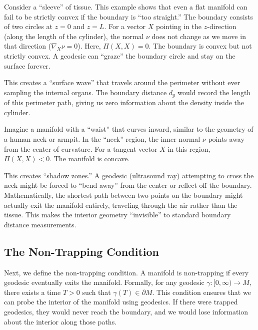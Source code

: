 \begin{example}
  Consider a ``sleeve'' of tissue. This example shows that even a flat manifold can fail to be strictly convex if the boundary is ``too straight.'' The boundary consists of two circles at $z = 0$ and $z = L$. For a vector $X$ pointing in the $z$-direction (along the length of the cylinder), the normal $\nu$ does not change as we move in that direction ($\nabla_X \nu = 0$). Here, $\Pi(X, X) = 0$. The boundary is convex but not strictly convex. A geodesic can ``graze'' the boundary circle and stay on the surface forever.

  This creates a ``surface wave'' that travels around the perimeter without ever sampling the internal organs. The boundary distance $d_g$ would record the length of this perimeter path, giving us zero information about the density inside the cylinder.
\end{example}

\begin{example}
  Imagine a manifold with a ``waist'' that curves inward, similar to the geometry of a human neck or armpit. In the ``neck'' region, the inner normal $\nu$ points away from the center of curvature. For a tangent vector $X$ in this region, $\Pi(X, X) < 0$. The manifold is concave.

  This creates ``shadow zones.'' A geodesic (ultrasound ray) attempting to cross the neck might be forced to ``bend away'' from the center or reflect off the boundary. Mathematically, the shortest path between two points on the boundary might actually exit the manifold entirely, traveling through the air rather than the tissue. This makes the interior geometry ``invisible'' to standard boundary distance measurements.
\end{example}

\subsection{The Non-Trapping Condition} Next, we define the non-trapping condition. A manifold is non-trapping if every geodesic eventually exits the manifold. Formally, for any geodesic $\gamma : [0, \infty) \to M$, there exists a time $T > 0$ such that $\gamma(T) \in \partial M$. This condition ensures that we can probe the interior of the manifold using geodesics. If there were trapped geodesics, they would never reach the boundary, and we would lose information about the interior along those paths.

